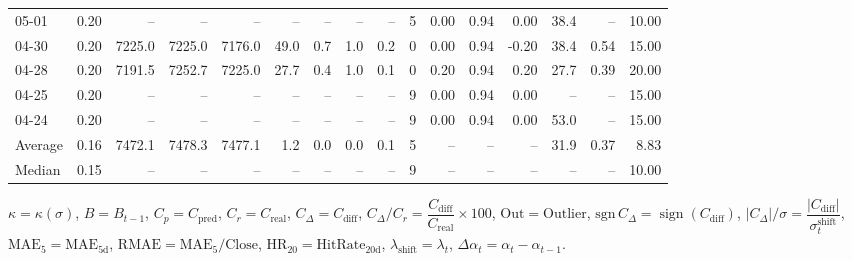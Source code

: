 \begin{threeparttable}
{\begin{tabular}{lrrrrrrrrrrrrrrr}
  05-01 &     0.20 &     -- &     -- &     -- &         -- &             -- &                       -- &                  -- &              5 &       0.00 &      0.94 &           0.00 &             38.4 &              -- &                  10.00 \\
  04-30 &     0.20 & 7225.0 & 7225.0 & 7176.0 &       49.0 &            0.7 &                      1.0 &                 0.2 &              0 &       0.00 &      0.94 &          -0.20 &             38.4 &            0.54 &                  15.00 \\
  04-28 &     0.20 & 7191.5 & 7252.7 & 7225.0 &       27.7 &            0.4 &                      1.0 &                 0.1 &              0 &       0.20 &      0.94 &           0.20 &             27.7 &            0.39 &                  20.00 \\
  04-25 &     0.20 &     -- &     -- &     -- &         -- &             -- &                       -- &                  -- &              9 &       0.00 &      0.94 &           0.00 &               -- &              -- &                  15.00 \\
  04-24 &     0.20 &     -- &     -- &     -- &         -- &             -- &                       -- &                  -- &              9 &       0.00 &      0.94 &           0.00 &             53.0 &              -- &                  15.00 \\
Average &     0.16 & 7472.1 & 7478.3 & 7477.1 &        1.2 &            0.0 &                      0.0 &                 0.1 &              5 &         -- &        -- &             -- &             31.9 &            0.37 &                   8.83 \\
 Median &     0.15 &     -- &     -- &     -- &         -- &             -- &                       -- &                  -- &              9 &         -- &        -- &             -- &               -- &              -- &                  10.00 \\
\bottomrule
\end{tabular}
}
\begin{tablenotes}\footnotesize
\item $\kappa=\kappa(\sigma)$, $B=B_{t-1}$, $C_p=C_{\text{pred}}$, $C_r=C_{\text{real}}$, $C_\Delta=C_{\text{diff}}$, $C_\Delta/C_r=\dfrac{C_{\text{diff}}}{C_{\text{real}}}\times100$, $\mathrm{Out}=\text{Outlier}$, $\mathrm{sgn}\,C_\Delta=\operatorname{sign}(C_{\text{diff}})$, $|C_\Delta|/\sigma=\dfrac{|C_{\text{diff}}|}{\sigma_t^{\text{shift}}}$, $\mathrm{MAE}_5=\mathrm{MAE}_{5\text{d}}$, $\mathrm{RMAE}= \mathrm{MAE}_5 / \text{Close}$, $\mathrm{HR}_{20}=\mathrm{HitRate}_{20\text{d}}$, 
$\lambda_{\text{shift}}=\lambda_t$, 
$\Delta\alpha_t=\alpha_t-\alpha_{t-1}$.
\end{tablenotes}
\end{threeparttable}
\endgroup


